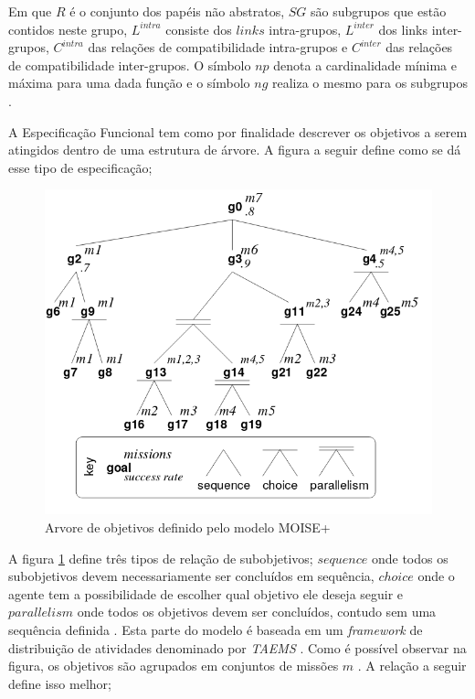 Em que $R$ é o conjunto dos papéis não abstratos, $SG$ são subgrupos que estão contidos neste grupo, $L^{intra}$ consiste dos $links$ intra-grupos, $L^{inter}$ dos links inter-grupos, 
$C^{intra}$ das relações de compatibilidade intra-grupos e $C^{inter}$ das relações de compatibilidade inter-grupos. O símbolo $np$ denota a cardinalidade mínima e máxima para uma dada 
função e o símbolo $ng$ realiza o mesmo para os subgrupos \cite{moiseframework}. 

A Especificação Funcional tem como por finalidade descrever os objetivos a serem atingidos dentro de uma estrutura de árvore. A figura a seguir define como se dá esse tipo de especificação; 

\begin{figure}[H]
  \centering
  \includegraphics[width=0.8\linewidth]{figure/figmoise} 
  \caption{Arvore de objetivos definido pelo modelo MOISE+ \cite{moiseframework}}
  \label{arvoremoise}
\end{figure}

A figura \ref{arvoremoise} define três tipos de relação de subobjetivos; $sequence$ onde todos os subobjetivos devem necessariamente ser concluídos em sequência, $choice$ onde o agente tem a 
possibilidade de escolher qual objetivo ele deseja seguir e $parallelism$ onde todos os objetivos devem ser concluídos, contudo sem uma sequência definida \cite{taems01} \cite{taems02}. Esta
parte do modelo é baseada em um \textit{framework} de distribuição de atividades denominado por \textit{TAEMS} \cite{TAEMS}.
Como é possível observar na figura, os objetivos são agrupados em conjuntos de missões $m$ \cite{dynamicagenttemporalstruct}. A relação a seguir define isso melhor;

